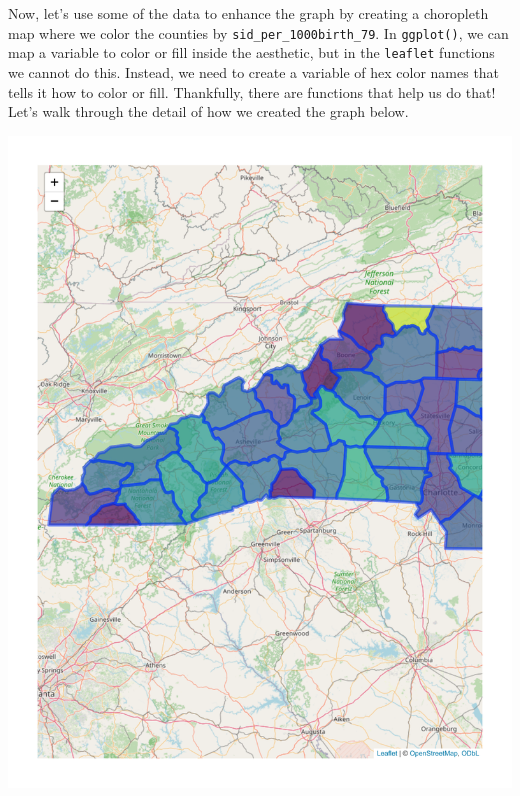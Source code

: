 \documentclass[
  letterpaper,
  DIV=11,
  numbers=noendperiod]{scrreprt}
\newenvironment{Shaded}{\begin{snugshade}}{\end{snugshade}}
\newcommand{\AttributeTok}[1]{\textcolor[rgb]{0.40,0.45,0.13}{#1}}
\newcommand{\CommentTok}[1]{\textcolor[rgb]{0.37,0.37,0.37}{#1}}
\newcommand{\FloatTok}[1]{\textcolor[rgb]{0.68,0.00,0.00}{#1}}
\newcommand{\FunctionTok}[1]{\textcolor[rgb]{0.28,0.35,0.67}{#1}}
\newcommand{\NormalTok}[1]{\textcolor[rgb]{0.00,0.23,0.31}{#1}}
\newcommand{\OtherTok}[1]{\textcolor[rgb]{0.00,0.23,0.31}{#1}}
\newcommand{\SpecialCharTok}[1]{\textcolor[rgb]{0.37,0.37,0.37}{#1}}
\newcommand{\StringTok}[1]{\textcolor[rgb]{0.13,0.47,0.30}{#1}}
\begin{document}
Now, let's use some of the data to enhance the graph by creating a
choropleth map where we color the counties by
\texttt{sid\_per\_1000birth\_79}. In \texttt{ggplot()}, we can map a
variable to color or fill inside the aesthetic, but in the
\texttt{leaflet} functions we cannot do this. Instead, we need to create
a variable of hex color names that tells it how to color or fill.
Thankfully, there are functions that help us do that! Let's walk through
the detail of how we created the graph below.

\begin{Shaded}
\end{Shaded}

\includegraphics{src/06-Spatial_Viz_files/figure-pdf/choro-1.pdf}
\end{document}
